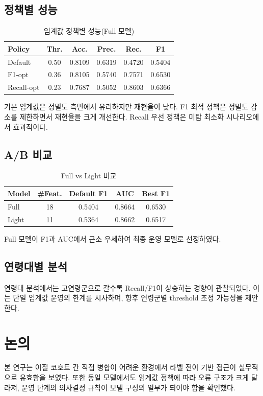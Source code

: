 \documentclass[10pt,twocolumn]{article}
\begin{document}
\subsection{정책별 성능}
\begin{table}[h]
\centering
\caption{임계값 정책별 성능(Full 모델)}
\begin{tabular}{lccccc}
\toprule
Policy & Thr. & Acc. & Prec. & Rec. & F1 \\
\midrule
Default & 0.50 & 0.8109 & 0.6319 & 0.4720 & 0.5404 \\
F1-opt & 0.36 & 0.8105 & 0.5740 & 0.7571 & 0.6530 \\
Recall-opt & 0.23 & 0.7687 & 0.5052 & 0.8603 & 0.6366 \\
\bottomrule
\end{tabular}
\end{table}

기본 임계값은 정밀도 측면에서 유리하지만 재현율이 낮다.
F1 최적 정책은 정밀도 감소를 제한하면서 재현율을 크게 개선한다.
Recall 우선 정책은 미탐 최소화 시나리오에서 효과적이다.

\subsection{A/B 비교}
\begin{table}[h]
\centering
\caption{Full vs Light 비교}
\begin{tabular}{lcccc}
\toprule
Model & \#Feat. & Default F1 & AUC & Best F1 \\
\midrule
Full & 18 & 0.5404 & 0.8664 & 0.6530 \\
Light & 11 & 0.5364 & 0.8662 & 0.6517 \\
\bottomrule
\end{tabular}
\end{table}

Full 모델이 F1과 AUC에서 근소 우세하여 최종 운영 모델로 선정하였다.

\subsection{연령대별 분석}
연령대 분석에서는 고연령군으로 갈수록 Recall/F1이 상승하는 경향이 관찰되었다.
이는 단일 임계값 운영의 한계를 시사하며, 향후 연령군별 threshold 조정 가능성을 제안한다.

\section{논의}
본 연구는 이질 코호트 간 직접 병합이 어려운 환경에서 라벨 전이 기반 접근이 실무적으로 유효함을 보였다.
또한 동일 모델에서도 임계값 정책에 따라 오류 구조가 크게 달라져, 운영 단계의 의사결정 규칙이 모델 구성의 일부가 되어야 함을 확인했다.
\end{document}
